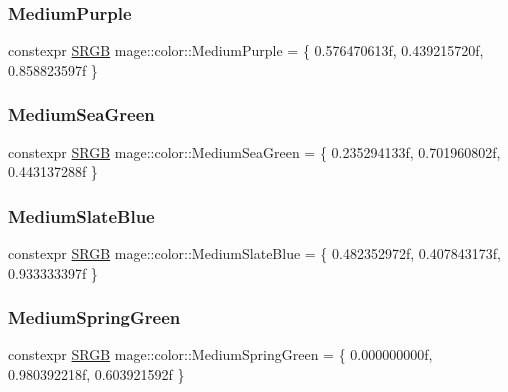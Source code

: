 \hypertarget{namespacemage_1_1color_a268bfcd5f8a8a72519e7bafe2a42d068}{}\label{namespacemage_1_1color_a268bfcd5f8a8a72519e7bafe2a42d068} 
\subsubsection{\texorpdfstring{Medium\+Purple}{MediumPurple}}
{\footnotesize\ttfamily constexpr \hyperlink{structmage_1_1_s_r_g_b}{S\+R\+GB} mage\+::color\+::\+Medium\+Purple = \{ 0.\+576470613f, 0.\+439215720f, 0.\+858823597f \}}

\hypertarget{namespacemage_1_1color_a1d53cd3d2b17db6ffe78d7fea95d7f5d}{}\label{namespacemage_1_1color_a1d53cd3d2b17db6ffe78d7fea95d7f5d} 
\subsubsection{\texorpdfstring{Medium\+Sea\+Green}{MediumSeaGreen}}
{\footnotesize\ttfamily constexpr \hyperlink{structmage_1_1_s_r_g_b}{S\+R\+GB} mage\+::color\+::\+Medium\+Sea\+Green = \{ 0.\+235294133f, 0.\+701960802f, 0.\+443137288f \}}

\hypertarget{namespacemage_1_1color_a8d7f9b57c4ef5b5f79eb2c73ec399195}{}\label{namespacemage_1_1color_a8d7f9b57c4ef5b5f79eb2c73ec399195} 
\subsubsection{\texorpdfstring{Medium\+Slate\+Blue}{MediumSlateBlue}}
{\footnotesize\ttfamily constexpr \hyperlink{structmage_1_1_s_r_g_b}{S\+R\+GB} mage\+::color\+::\+Medium\+Slate\+Blue = \{ 0.\+482352972f, 0.\+407843173f, 0.\+933333397f \}}

\hypertarget{namespacemage_1_1color_ac6e9e1bbaaf7e34c678be9b8f7dda59f}{}\label{namespacemage_1_1color_ac6e9e1bbaaf7e34c678be9b8f7dda59f} 
\subsubsection{\texorpdfstring{Medium\+Spring\+Green}{MediumSpringGreen}}
{\footnotesize\ttfamily constexpr \hyperlink{structmage_1_1_s_r_g_b}{S\+R\+GB} mage\+::color\+::\+Medium\+Spring\+Green = \{ 0.\+000000000f, 0.\+980392218f, 0.\+603921592f \}}

